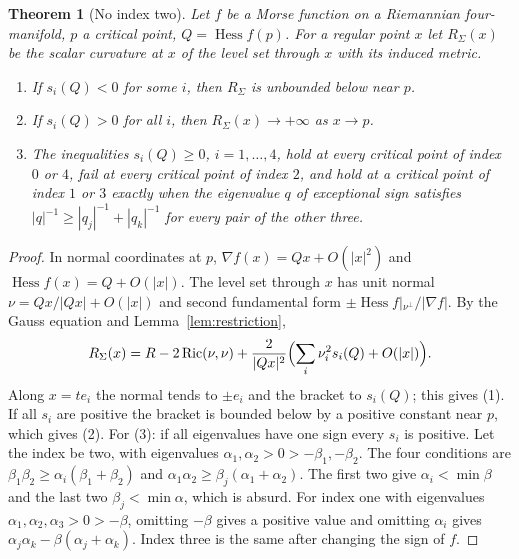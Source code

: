 \documentclass[11pt,letterpaper]{article}
\numberwithin{equation}{section}
\newtheorem{theorem}{Theorem}[section]
\theoremstyle{definition}
\DeclareMathOperator{\Ric}{Ric}
\DeclareMathOperator{\Hess}{Hess}
\begin{document}
\begin{theorem}[No index two]\label{thm:index}
Let \(f\) be a Morse function on a Riemannian four-manifold, \(p\) a
critical point, \(Q=\Hess f(p)\). For a regular point \(x\) let
\(R_\Sigma(x)\) be the scalar curvature at \(x\) of the level set through
\(x\) with its induced metric.
\begin{enumerate}
\item If \(s_i(Q)<0\) for some \(i\), then \(R_\Sigma\) is unbounded below
near \(p\).
\item If \(s_i(Q)>0\) for all \(i\), then \(R_\Sigma(x)\to+\infty\) as
\(x\to p\).
\item The inequalities \(s_i(Q)\ge0\), \(i=1,\dots,4\), hold at every
critical point of index \(0\) or \(4\), fail at every critical point of
index \(2\), and hold at a critical point of index \(1\) or \(3\) exactly
when the eigenvalue \(q\) of exceptional sign satisfies
\(|q|^{-1}\ge|q_j|^{-1}+|q_k|^{-1}\) for every pair of the other three.
\end{enumerate}
\end{theorem}
\begin{proof}
In normal coordinates at \(p\), \(\nabla f(x)=Qx+O(|x|^2)\) and
\(\Hess f(x)=Q+O(|x|)\). The level set through \(x\) has unit normal
\(\nu=Qx/|Qx|+O(|x|)\) and second fundamental form
\(\pm\Hess f|_{\nu^\perp}/|\nabla f|\). By the Gauss equation and
Lemma~\ref{lem:restriction},
\[
 R_\Sigma(x)=R-2\Ric(\nu,\nu)+\frac{2}{|Qx|^2}\Bigl(\sum_i\nu_i^2s_i(Q)+O(|x|)\Bigr).
\]
Along \(x=te_i\) the normal tends to \(\pm e_i\) and the bracket to
\(s_i(Q)\); this gives (1). If all \(s_i\) are positive the bracket is
bounded below by a positive constant near \(p\), which gives (2). For (3):
if all eigenvalues have one sign every \(s_i\) is positive. Let the index
be two, with eigenvalues \(\alpha_1,\alpha_2>0>-\beta_1,-\beta_2\). The
four conditions are \(\beta_1\beta_2\ge\alpha_i(\beta_1+\beta_2)\) and
\(\alpha_1\alpha_2\ge\beta_j(\alpha_1+\alpha_2)\). The first two give
\(\alpha_i<\min\beta\) and the last two \(\beta_j<\min\alpha\), which is
absurd. For index one with eigenvalues \(\alpha_1,\alpha_2,\alpha_3>0>-\beta\),
omitting \(-\beta\) gives a positive value and omitting \(\alpha_i\) gives
\(\alpha_j\alpha_k-\beta(\alpha_j+\alpha_k)\). Index three is the same
after changing the sign of \(f\).
\end{proof}
\end{document}
